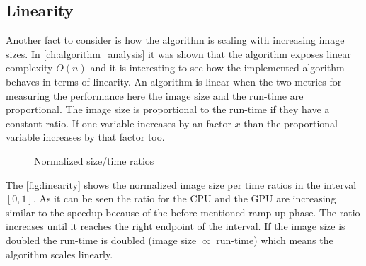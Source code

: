 \subsection{Linearity} %
\label{ssub:linearity}
Another fact to consider is how the algorithm is scaling with increasing image
sizes. In \autoref{ch:algorithm_analysis} it was shown that the algorithm
exposes linear complexity $O(n)$ and it is interesting to see how the
implemented algorithm behaves in terms of linearity. An algorithm is linear when
the two metrics for measuring the performance here the image size and the
run-time are proportional. The image size is proportional to the run-time if 
they have a constant ratio. If one variable increases by an factor $x$ than the
proportional variable increases by that factor too.
\begin{figure}[ht]
  \centering
	

	\tableA

	\caption{Normalized size/time ratios}%
	\label{fig:linearity}
 \end{figure}

The \autoref{fig:linearity} shows the normalized image size per time ratios in
the interval $[0,1]$. As it can be seen the ratio for the \gls{CPU} and the
\gls{GPU} are increasing similar to the speedup because of the before mentioned
ramp-up phase. The ratio increases until it reaches the right endpoint of the
interval. If the image size is doubled the run-time is doubled (image size
$\propto$ run-time) which means the algorithm scales linearly.


